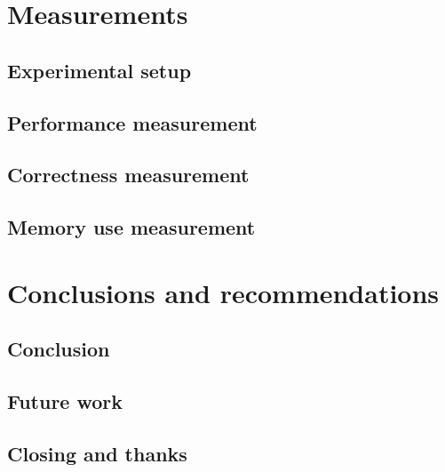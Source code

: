 \documentclass[11pt,a4paper]{report}
\begin{document}
	\chapter{Measurements}
	\label{chap:measurements}
	
	
		\section{Experimental setup}
		
		
		\section{Performance measurement}
		
		
		\section{Correctness measurement}
		
		
		\section{Memory use measurement}
		
	
	\chapter{Conclusions and recommendations}
	\label{chap:ccl}
	
	
		\section{Conclusion}
		
		
		\section{Future work}		
		

		\section{Closing and thanks}
		
	
	\printbibliography
\end{document}
